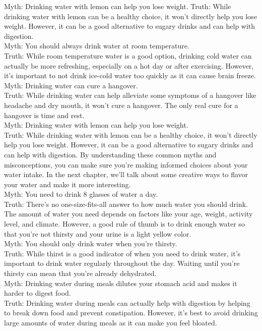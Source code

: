 Myth: Drinking water with lemon can help you lose weight.
Truth: While drinking water with lemon can be a healthy choice, it won't directly help you lose weight. However, it can be a good alternative to sugary drinks and can help with digestion.\\
Myth: You should always drink water at room temperature.\\
Truth: While room temperature water is a good option, drinking cold water can actually be more refreshing, especially on a hot day or after exercising. However, it's important to not drink ice-cold water too quickly as it can cause brain freeze.\\
Myth: Drinking water can cure a hangover.\\
Truth: While drinking water can help alleviate some symptoms of a hangover like headache and dry mouth, it won't cure a hangover. The only real cure for a hangover is time and rest.\\
Myth: Drinking water with lemon can help you lose weight.\\
Truth: While drinking water with lemon can be a healthy choice, it won't directly help you lose weight. However, it can be a good alternative to sugary drinks and can help with digestion.
By understanding these common myths and misconceptions, you can make sure you're making informed choices about your water intake. In the next chapter, we'll talk about some creative ways to flavor your water and make it more interesting.\\
Myth: You need to drink 8 glasses of water a day. \\
Truth: There's no one-size-fits-all answer to how much water you should drink. The amount of water you need depends on factors like your age, weight, activity level, and climate. However, a good rule of thumb is to drink enough water so that you're not thirsty and your urine is a light yellow color. \\
Myth: You should only drink water when you're thirsty. \\
Truth: While thirst is a good indicator of when you need to drink water, it's important to drink water regularly throughout the day. Waiting until you're thirsty can mean that you're already dehydrated. \\
Myth: Drinking water during meals dilutes your stomach acid and makes it harder to digest food. \\
Truth: Drinking water during meals can actually help with digestion by helping to break down food and prevent constipation. However, it's best to avoid drinking large amounts of water during meals as it can make you feel bloated. \\
